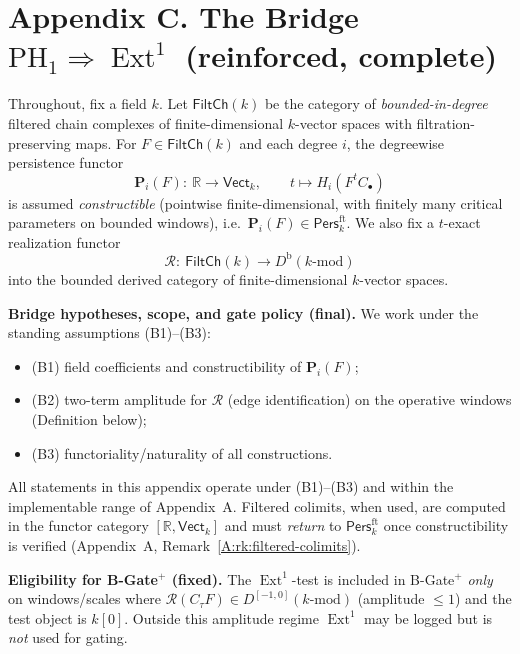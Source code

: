 \documentclass[11pt]{article}
\numberwithin{equation}{section}
\theoremstyle{plain}
\theoremstyle{definition}
\theoremstyle{remark}
\DeclareMathOperator{\Ext}{Ext}
\newcommand{\Pers}{\mathsf{Pers}}
\theoremstyle{plain}
\theoremstyle{definition}
\numberwithin{equation}{section}
\theoremstyle{definition}
\numberwithin{equation}{section}
\theoremstyle{plain}
\theoremstyle{definition}
\theoremstyle{remark}
\begin{document}
\endgroup



\appendix
\section*{Appendix C. The Bridge \texorpdfstring{$\mathrm{PH}_1 \Rightarrow \Ext^1$}{PH1⇒Ext1} (reinforced, complete)}


Throughout, fix a field \(k\).
Let \(\mathsf{FiltCh}(k)\) be the category of \emph{bounded-in-degree} filtered chain complexes of finite-dimensional \(k\)-vector spaces with filtration-preserving maps.
For \(F\in\mathsf{FiltCh}(k)\) and each degree \(i\), the degreewise persistence functor
\[
\mathbf{P}_i(F):\ \mathbb{R}\longrightarrow \mathsf{Vect}_k,\qquad t\longmapsto H_i(F^{t}C_\bullet)
\]
is assumed \emph{constructible} (pointwise finite-dimensional, with finitely many critical parameters on bounded windows), i.e.\ \(\mathbf{P}_i(F)\in \Pers^{\mathrm{ft}}_k\).
We also fix a \(t\)-exact realization functor
\[
\mathcal{R}:\ \mathsf{FiltCh}(k)\longrightarrow D^{\mathrm{b}}(k\text{-mod})
\]
into the bounded derived category of finite-dimensional \(k\)-vector spaces.

\medskip
\noindent\textbf{Bridge hypotheses, scope, and gate policy (final).}
We work under the standing assumptions \textup{(B1)–(B3)}:
\begin{itemize}
  \item \textup{(B1)} field coefficients and constructibility of \(\mathbf{P}_i(F)\);
  \item \textup{(B2)} two-term amplitude for \(\mathcal{R}\) (edge identification) on the operative windows (Definition below);
  \item \textup{(B3)} functoriality/naturality of all constructions.
\end{itemize}
All statements in this appendix operate under \textup{(B1)–(B3)} and within the implementable range of Appendix~A.
Filtered colimits, when used, are computed in the functor category \([\mathbb{R},\mathsf{Vect}_k]\) and must \emph{return} to \(\Pers^{\mathrm{ft}}_k\) once constructibility is verified (Appendix~A, Remark~\ref{A:rk:filtered-colimits}).

\smallskip
\noindent\textbf{Eligibility for B-Gate\(^{+}\) (fixed).}
The \(\Ext^1\)-test is included in B-Gate\(^{+}\) \emph{only} on windows/scales where \(\mathcal{R}(C_\tau F)\in D^{[-1,0]}(k\text{-mod})\) (amplitude \(\le 1\)) and the test object is \(k[0]\).
Outside this amplitude regime \(\Ext^1\) may be logged but is \emph{not} used for gating.
\end{document}
